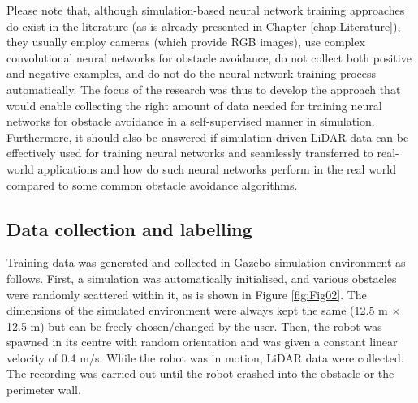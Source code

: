 Please note that, although simulation-based neural network training approaches do exist in the literature (as is already presented in Chapter \ref{chap:Literature}), they usually employ cameras (which provide RGB images), use complex convolutional neural networks for obstacle avoidance, do not collect both positive and negative examples, and do not do the neural network training process automatically. The focus of the research was thus to develop the approach that would enable collecting the right amount of data needed for training neural networks for obstacle avoidance in a self-supervised manner in simulation. Furthermore, it should also be answered if simulation-driven LiDAR data can be effectively used for training neural networks and seamlessly transferred to real-world applications and how do such neural networks perform in the real world compared to some common obstacle avoidance algorithms.

\subsection{Data collection and labelling}

Training data was generated and collected in Gazebo simulation environment \cite{Koenig2004} as follows. First, a simulation was automatically initialised, and various obstacles were randomly scattered within it, as is shown in Figure \ref{fig:Fig02}. The dimensions of the simulated environment were always kept the same (12.5 m $\times$ 12.5 m) but can be freely chosen/changed by the user. Then, the robot was spawned in its centre with random orientation and was given a constant linear velocity of 0.4 m/s. While the robot was in motion, LiDAR data were collected. The recording was carried out until the robot crashed into the obstacle or the perimeter wall.

